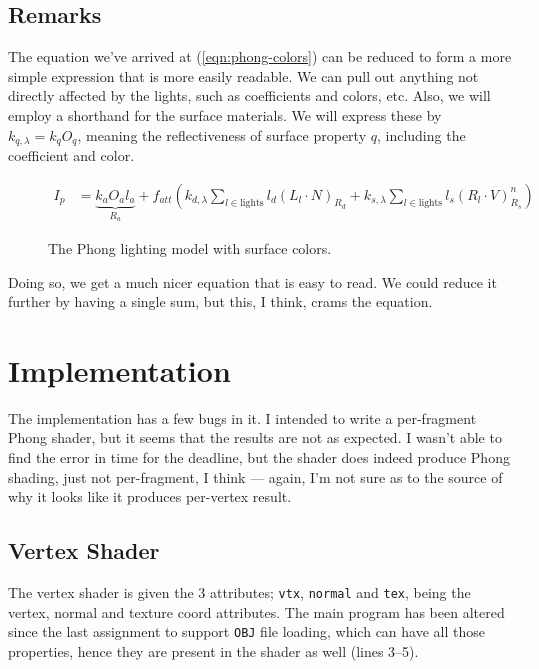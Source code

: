 \documentclass[11pt]{article}
\newcommand{\code}[1]{{\tt #1}}
\begin{document}
\subsection{Remarks}
The equation we've arrived at (\ref{eqn:phong-colors}) can be reduced to form
a more simple expression that is more easily readable. We can pull out
anything not directly affected by the lights, such as coefficients and colors,
etc. Also, we will employ a shorthand for the surface materials. We will
express these by $k_{q,\lambda} = k_q O_q$, meaning the reflectiveness of
surface property $q$, including the coefficient and color.

\begin{figure}[H]
    \begin{align}
        I_p &= \underbrace{k_a O_a l_a}_{R_a}
             + f_{att} \left( k_{d, \lambda}
               \sum_{l \in \text{lights}} l_d (L_l \cdot N)_{R_d}
             + k_{s, \lambda}
               \sum_{l \in \text{lights}} l_s (R_l \cdot V)^n_{R_s}\right)
    \end{align}
    \caption{The Phong lighting model with surface colors.}
    \label{eqn:phong-final}
\end{figure}

Doing so, we get a much nicer equation that is easy to read. We could reduce
it further by having a single sum, but this, I think, crams the equation.

\newpage
\section{Implementation}
The implementation has a few bugs in it. I intended to write a per-fragment
Phong shader, but it seems that the results are not as expected. I wasn't
able to find the error in time for the deadline, but the shader does indeed
produce Phong shading, just not per-fragment, I think --- again, I'm not sure
as to the source of why it looks like it produces per-vertex result.

\subsection{Vertex Shader}
The vertex shader is given the 3 attributes; \code{vtx}, \code{normal} and
\code{tex}, being the vertex, normal and texture coord attributes. The main
program has been altered since the last assignment to support \code{OBJ} file
loading, which can have all those properties, hence they are present in the
shader as well (lines 3--5).
\end{document}
